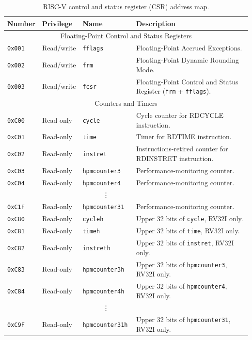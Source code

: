 \begin{table}[htb!]
\begin{center}
\begin{tabular}{|l|l|l|l|}
\hline
Number    & Privilege & Name & Description \\
\hline
\multicolumn{4}{|c|}{Floating-Point Control and Status Registers} \\
\hline
\tt 0x001 & Read/write  &\tt fflags     & Floating-Point Accrued Exceptions. \\
\tt 0x002 & Read/write  &\tt frm        & Floating-Point Dynamic Rounding Mode. \\
\tt 0x003 & Read/write  &\tt fcsr       & Floating-Point Control and Status
Register ({\tt frm} + {\tt fflags}). \\
\hline
\multicolumn{4}{|c|}{Counters and Timers} \\
\hline
\tt 0xC00 & Read-only  &\tt cycle      & Cycle counter for RDCYCLE instruction. \\
\tt 0xC01 & Read-only  &\tt time       & Timer for RDTIME instruction. \\
\tt 0xC02 & Read-only  &\tt instret    & Instructions-retired counter for RDINSTRET instruction. \\
\tt 0xC03 & Read-only  &\tt hpmcounter3   & Performance-monitoring counter. \\
\tt 0xC04 & Read-only  &\tt hpmcounter4   & Performance-monitoring counter. \\
& & \multicolumn{1}{c|}{\vdots} & \ \\
\tt 0xC1F & Read-only  &\tt hpmcounter31  & Performance-monitoring counter. \\
\tt 0xC80 & Read-only  &\tt cycleh     & Upper 32 bits of {\tt cycle}, RV32I only. \\
\tt 0xC81 & Read-only  &\tt timeh      & Upper 32 bits of {\tt time}, RV32I only. \\
\tt 0xC82 & Read-only  &\tt instreth   & Upper 32 bits of {\tt instret}, RV32I only. \\
\tt 0xC83 & Read-only  &\tt hpmcounter3h  & Upper 32 bits of {\tt hpmcounter3}, RV32I only. \\
\tt 0xC84 & Read-only  &\tt hpmcounter4h  & Upper 32 bits of {\tt hpmcounter4}, RV32I only. \\
& & \multicolumn{1}{c|}{\vdots} & \ \\
\tt 0xC9F & Read-only  &\tt hpmcounter31h & Upper 32 bits of {\tt hpmcounter31}, RV32I only. \\
\hline
\end{tabular}
\end{center}
\caption{RISC-V control and status register (CSR) address map.}
\label{rvgcsrnames}
\end{table}
